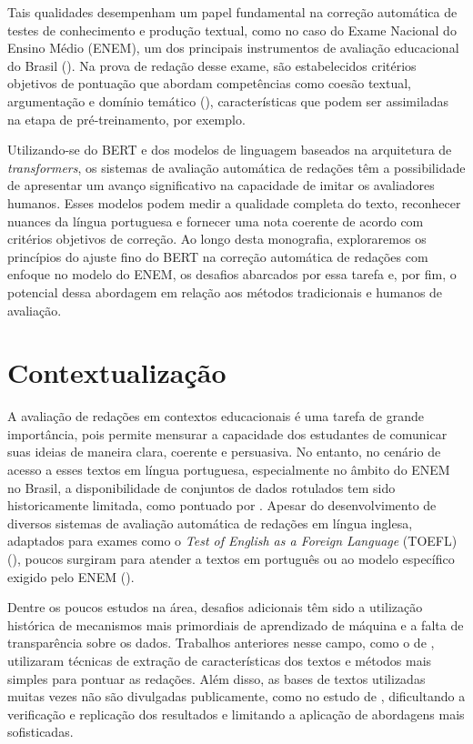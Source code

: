 Tais qualidades desempenham um papel fundamental na correção automática de testes de conhecimento e produção textual, como no caso do Exame Nacional do Ensino Médio (ENEM), um dos principais instrumentos de avaliação educacional do Brasil (\cite{oliveira-2016-enem}). Na prova de redação desse exame, são estabelecidos critérios objetivos de pontuação que abordam competências como coesão textual, argumentação e domínio temático (\cite{cartilha-redacao}), características que podem ser assimiladas na etapa de pré-treinamento, por exemplo.

Utilizando-se do BERT e dos modelos de linguagem baseados na arquitetura de \textit{transformers}, os sistemas de avaliação automática de redações têm a possibilidade de apresentar um avanço significativo na capacidade de imitar os avaliadores humanos. Esses modelos podem medir a qualidade completa do texto, reconhecer nuances da língua portuguesa e fornecer uma nota coerente de acordo com critérios objetivos de correção. Ao longo desta monografia, exploraremos os princípios do ajuste fino do BERT na correção automática de redações com enfoque no modelo do ENEM, os desafios abarcados por essa tarefa e, por fim, o potencial dessa abordagem em relação aos métodos tradicionais e humanos de avaliação.

\section{Contextualização}

A avaliação de redações em contextos educacionais é uma tarefa de grande importância, pois permite mensurar a capacidade dos estudantes de comunicar suas ideias de maneira clara, coerente e persuasiva. No entanto, no cenário de acesso a esses textos em língua portuguesa, especialmente no âmbito do ENEM no Brasil, a disponibilidade de conjuntos de dados rotulados tem sido historicamente limitada, como pontuado por \citet{marinho-et-al-21}. Apesar do desenvolvimento de diversos sistemas de avaliação automática de redações em língua inglesa, adaptados para exames como o \textit{Test of English as a Foreign Language} (TOEFL) (\cite{rupp-etal-2019}), poucos surgiram para atender a textos em português ou ao modelo específico exigido pelo ENEM (\cite{amorim-et-al-2017}).

Dentre os poucos estudos na área, desafios adicionais têm sido a utilização histórica de mecanismos mais primordiais de aprendizado de máquina e a falta de transparência sobre os dados. Trabalhos anteriores nesse campo, como o de \citet{amorim-et-al-2017}, utilizaram técnicas de extração de características dos textos e métodos mais simples para pontuar as redações. Além disso, as bases de textos utilizadas muitas vezes não são divulgadas publicamente, como no estudo de \citet{fonseca-et-al-2018}, dificultando a verificação e replicação dos resultados e limitando a aplicação de abordagens mais sofisticadas.

